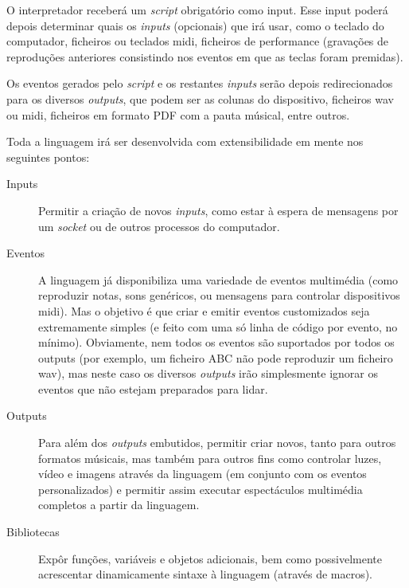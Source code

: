 \documentclass[
  oneside,
  11pt, a4paper,
  footinclude=true,
  headinclude=true,
  cleardoublepage=empty
]{scrbook}
\begin{document}
	O interpretador receberá um \textit{script} obrigatório como input. Esse input poderá depois determinar quais os \textit{inputs} (opcionais) que irá usar, como o teclado do computador, ficheiros ou teclados \acrshort{midi}, ficheiros de performance (gravações de reproduções anteriores consistindo nos eventos em que as teclas foram premidas).
	
	Os eventos gerados pelo \textit{script} e os restantes \textit{inputs} serão depois redirecionados para os diversos \textit{outputs}, que podem ser as colunas do dispositivo, ficheiros \acrshort{wav} ou \acrshort{midi}, ficheiros em formato PDF com a pauta músical, entre outros.
	
	Toda a linguagem irá ser desenvolvida com extensibilidade em mente nos seguintes pontos:
	\begin{description}
	 \item[Inputs] Permitir a criação de novos \textit{inputs}, como estar à espera de mensagens por um \textit{socket} ou de outros processos do computador.
	 \item[Eventos] A linguagem já disponibiliza uma variedade de eventos multimédia (como reproduzir notas, sons genéricos, ou mensagens para controlar dispositivos \acrshort{midi}). Mas o objetivo é que criar e emitir eventos customizados seja extremamente simples (e feito com uma só linha de código por evento, no mínimo). Obviamente, nem todos os eventos são suportados por todos os outputs (por exemplo, um ficheiro ABC não pode reproduzir um ficheiro \acrshort{wav}), mas neste caso os diversos \textit{outputs} irão simplesmente ignorar os eventos que não estejam preparados para lidar.
	 \item[Outputs] Para além dos \textit{outputs} embutidos, permitir criar novos, tanto para outros formatos músicais, mas também para outros fins como controlar luzes, vídeo e imagens através da linguagem (em conjunto com os eventos personalizados) e permitir assim executar espectáculos multimédia completos a partir da linguagem.
	 \item[Bibliotecas] Expôr funções, variáveis e objetos adicionais, bem como possivelmente acrescentar dinamicamente sintaxe à linguagem (através de macros).
	\end{description}
\end{document}
